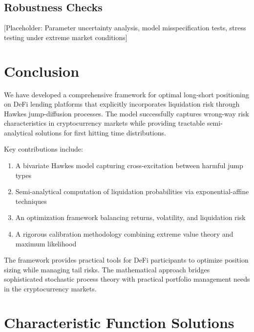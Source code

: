 \documentclass{article}
\theoremstyle{definition}
\begin{document}
\subsection{Robustness Checks}

[Placeholder: Parameter uncertainty analysis, model misspecification tests, stress testing under extreme market conditions]

\section{Conclusion}

We have developed a comprehensive framework for optimal long-short positioning on DeFi lending platforms that explicitly incorporates liquidation risk through Hawkes jump-diffusion processes. The model successfully captures wrong-way risk characteristics in cryptocurrency markets while providing tractable semi-analytical solutions for first hitting time distributions.

Key contributions include:
\begin{enumerate}
    \item A bivariate Hawkes model capturing cross-excitation between harmful jump types
    \item Semi-analytical computation of liquidation probabilities via exponential-affine techniques
    \item An optimization framework balancing returns, volatility, and liquidation risk
    \item A rigorous calibration methodology combining extreme value theory and maximum likelihood
\end{enumerate}

The framework provides practical tools for DeFi participants to optimize position sizing while managing tail risks. The mathematical approach bridges sophisticated stochastic process theory with practical portfolio management needs in the cryptocurrency markets.


\appendix

\section{Characteristic Function Solutions}
\label{sec:characteristic_function}
\end{document}
